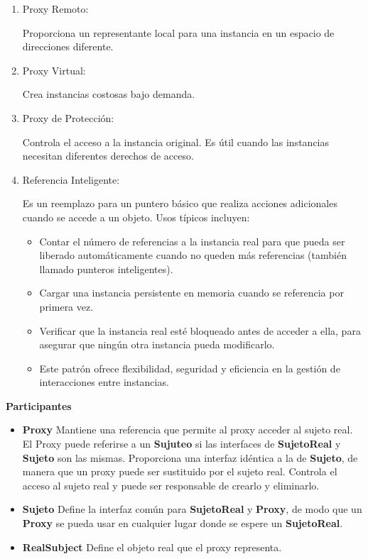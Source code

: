 \begin{enumerate}
\item Proxy Remoto:

Proporciona un representante local para una instancia en un espacio de direcciones diferente.

\item Proxy Virtual:

Crea instancias costosas bajo demanda.

\item Proxy de Protección:

Controla el acceso a la instancia original.
Es útil cuando las instancias necesitan diferentes derechos de acceso.

\item Referencia Inteligente:

Es un reemplazo para un puntero básico que realiza acciones adicionales cuando se accede a un objeto.
Usos típicos incluyen:
\begin{itemize}
\item Contar el número de referencias a la instancia real para que pueda ser liberado automáticamente cuando no queden más referencias (también llamado punteros inteligentes).
\item Cargar una instancia persistente en memoria cuando se referencia por primera vez.
\item Verificar que la instancia real esté bloqueado antes de acceder a ella, para asegurar que ningún otra instancia pueda modificarlo.
\item 
Este patrón ofrece flexibilidad, seguridad y eficiencia en la gestión de interacciones entre instancias.
\end{itemize}

\end{enumerate}


\textbf{Participantes}

\begin{itemize}
\item \textbf{Proxy} Mantiene una referencia que permite al proxy acceder al sujeto real. El Proxy puede referirse a un \textbf{Sujuteo} si las interfaces de \textbf{SujetoReal} y \textbf{Sujeto} son las mismas.
Proporciona una interfaz idéntica a la de \textbf{Sujeto}, de manera que un proxy puede ser sustituido por el sujeto real.
Controla el acceso al sujeto real y puede ser responsable de crearlo y eliminarlo.

\item \textbf{Sujeto} Define la interfaz común para \textbf{SujetoReal} y \textbf{Proxy}, de modo que un \textbf{Proxy} se pueda usar en cualquier lugar donde se espere un \textbf{SujetoReal}.

\item \textbf{RealSubject} Define el objeto real que el proxy representa.

\end{itemize}


